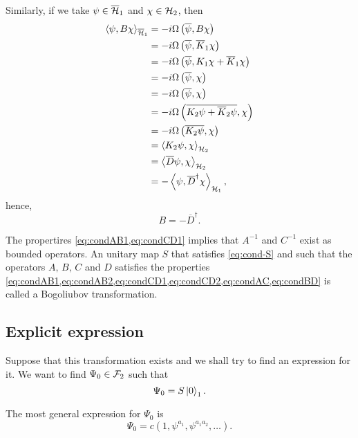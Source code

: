 Similarly, if we take \(\psi\in\overline{{\mathcal{H}}}_1\) and \(\chi\in{\mathcal{H}}_2\), then
\begin{subequations}
    \begin{align}
        \left\langle \psi, B\chi\right\rangle_{\overline{{\mathcal{H}}}_1}&=-i\Omega\left(\overline{\psi},B\chi\right)\\
        &=-i\Omega\left(\overline{\psi},\overline{K}_1\chi\right)\\
        &=-i\Omega\left(\overline{\psi},K_1\chi+\overline{K}_1\chi\right)\\
        &=-i\Omega\left(\overline{\psi},\chi\right)\\
        &=-i\Omega\left(\overline{\psi},\chi\right)\\
        &=-i\Omega\left(\overline{K_2\psi+\overline{K}_2\psi},\chi\right)\\
        &=-i\Omega\left(\overline{K_2\psi},\chi\right)\\
        &=\left\langle K_2\psi, \chi\right\rangle_{{\mathcal{H}}_2}\\
        &=\left\langle \overline{D}\psi, \chi\right\rangle_{{\mathcal{H}}_2}\\
        &=-\left\langle \psi, \overline{D}^{\dagger}\chi\right\rangle_{{\mathcal{H}}_1},
    \end{align}
\end{subequations}
hence,
\begin{equation}\label{eq:condBD}
    B=-\overline{D}^{\dagger}.
\end{equation}

The propertires \cref{eq:condAB1,eq:condCD1} implies that \(A^{-1}\) and \(C^{-1}\) exist as bounded operators. An unitary map \(S\) that satisfies \cref{eq:cond-S} and such that the operators \(A,\,B,\,C\) and \(D\) satisfies the properties \cref{eq:condAB1,eq:condAB2,eq:condCD1,eq:condCD2,eq:condAC,eq:condBD} is called a Bogoliubov transformation.

\subsection*{Explicit expression}
Suppose that this transformation exists and we shall try to find an expression for it. We want to find \(\Psi_0\in{\mathcal{F}}_2\) such that
\begin{equation}
    \Psi_0=S\ket{0}_1.
\end{equation}

The most general expression for \(\Psi_0\) is
\begin{equation}
    \Psi_0=c\left(1,\psi^{a_1},\psi^{a_1a_2},\dots\right).
\end{equation}

